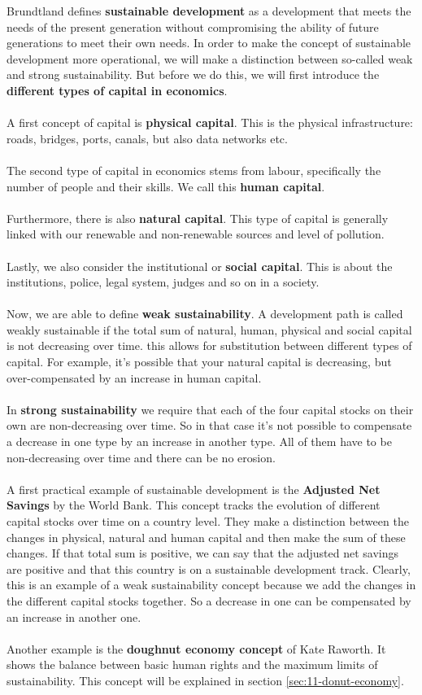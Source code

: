 \documentclass[../summary.tex]{subfiles}
\begin{document}
Brundtland defines \textbf{sustainable development} as a development that meets the needs of the present generation without compromising the ability of future generations to meet their own needs. In order to make the concept of sustainable development more operational, we will make a distinction between so-called weak and strong sustainability. But before we do this, we will first introduce the \textbf{different types of capital in economics}.
\\\\
A first concept of capital is \textbf{physical capital}. This is the physical infrastructure: roads, bridges, ports, canals, but also data networks etc.
\\\\
The second type of capital in economics stems from labour, specifically the number of people and their skills. We call this \textbf{human capital}.
\\\\
Furthermore, there is also \textbf{natural capital}. This type of capital is generally linked with our renewable and non-renewable sources and level of pollution.
\\\\
Lastly, we also consider the institutional or \textbf{social capital}. This is about the institutions, police, legal system, judges and so on in a society.
\\\\
Now, we are able to define \textbf{weak sustainability}. A development path is called weakly sustainable if the total sum of natural, human, physical and social capital is not decreasing over time. this allows for substitution between different types of capital. For example, it's possible that your natural capital is decreasing, but over-compensated by an increase in human capital.
\\\\
In \textbf{strong sustainability} we require that each of the four capital stocks on their own are non-decreasing over time. So in that case it's not possible to compensate a decrease in one type by an increase in another type. All of them have to be non-decreasing over time and there can be no erosion.
\\\\
A first practical example of sustainable development is the \textbf{Adjusted Net Savings} by the World Bank. This concept tracks the evolution of different capital stocks over time on a country level. They make a distinction between the changes in physical, natural and human capital and then make the sum of these changes. If that total sum is positive, we can say that the adjusted net savings are positive and that this country is on a sustainable development track. Clearly, this is an example of a weak sustainability concept because we add the changes in the different capital stocks together. So a decrease in one can be compensated by an increase in another one.
\\\\
Another example is the \textbf{doughnut economy concept} of Kate Raworth. It shows the balance between basic human rights and the maximum limits of sustainability. This concept will be explained in section \ref{sec:11-donut-economy}.
\end{document}
